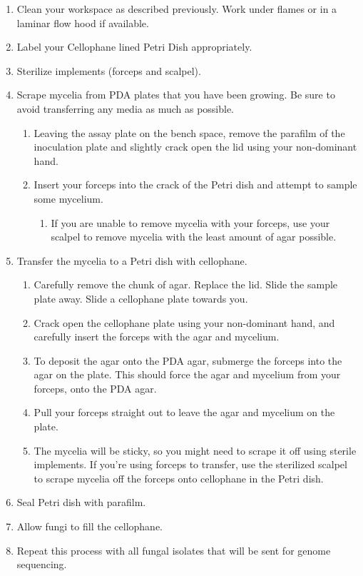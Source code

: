 \documentclass[
  letterpaper,
  DIV=11,
  numbers=noendperiod]{scrreprt}
\providecommand{\tightlist}{%
  \setlength{\itemsep}{0pt}\setlength{\parskip}{0pt}}
\begin{document}
\begin{enumerate}
\def\labelenumi{\arabic{enumi}.}
\tightlist
\item
  Clean your workspace as described previously. Work under flames or in
  a laminar flow hood if available.
\item
  Label your Cellophane lined Petri Dish appropriately.
\item
  Sterilize implements (forceps and scalpel).
\item
  Scrape mycelia from PDA plates that you have been growing. Be sure to
  avoid transferring any media as much as possible.

  \begin{enumerate}
  \def\labelenumii{\alph{enumii}.}
  \tightlist
  \item
    Leaving the assay plate on the bench space, remove the parafilm of
    the inoculation plate and slightly crack open the lid using your
    non-dominant hand.
  \item
    Insert your forceps into the crack of the Petri dish and attempt to
    sample some mycelium.

    \begin{enumerate}
    \def\labelenumiii{\roman{enumiii}.}
    \tightlist
    \item
      If you are unable to remove mycelia with your forceps, use your
      scalpel to remove mycelia with the least amount of agar possible.
    \end{enumerate}
  \end{enumerate}
\item
  Transfer the mycelia to a Petri dish with cellophane.

  \begin{enumerate}
  \def\labelenumii{\alph{enumii}.}
  \tightlist
  \item
    Carefully remove the chunk of agar. Replace the lid. Slide the
    sample plate away. Slide a cellophane plate towards you.
  \item
    Crack open the cellophane plate using your non-dominant hand, and
    carefully insert the forceps with the agar and mycelium.
  \item
    To deposit the agar onto the PDA agar, submerge the forceps into the
    agar on the plate. This should force the agar and mycelium from your
    forceps, onto the PDA agar.
  \item
    Pull your forceps straight out to leave the agar and mycelium on the
    plate.
  \item
    The mycelia will be sticky, so you might need to scrape it off using
    sterile implements. If you're using forceps to transfer, use the
    sterilized scalpel to scrape mycelia off the forceps onto cellophane
    in the Petri dish.
  \end{enumerate}
\item
  Seal Petri dish with parafilm.
\item
  Allow fungi to fill the cellophane.
\item
  Repeat this process with all fungal isolates that will be sent for
  genome sequencing.
\end{enumerate}
\end{document}
